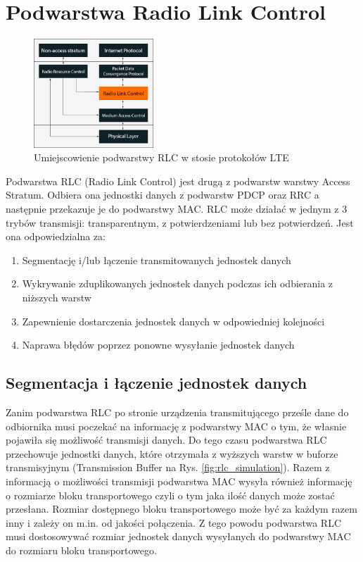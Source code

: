 \chapter{Podwarstwa Radio Link Control}
\label{cha:rlc}

\begin{figure}
	\centerline{\includegraphics[width=0.4\textwidth]{images/rlc_overview.png}}
	\caption{Umiejscowienie podwarstwy RLC w stosie protokołów LTE}
	\label{fig:rlc_overview}
\end{figure}

Podwarstwa RLC (Radio Link Control) jest drugą z podwarstw warstwy Access Stratum. Odbiera ona jednostki danych z podwarstw PDCP oraz RRC a następnie przekazuje je do podwarstwy MAC. RLC może działać w jednym z 3 trybów transmisji: transparentnym, z potwierdzeniami lub bez potwierdzeń. Jest ona odpowiedzialna za:

\begin{enumerate}
	\item Segmentację i/lub łączenie transmitowanych jednostek danych
	\item Wykrywanie zduplikowanych jednostek danych podczas ich odbierania z niższych warstw
	\item Zapewnienie dostarczenia jednostek danych w odpowiedniej kolejności
	\item Naprawa błędów poprzez ponowne wysyłanie jednostek danych
\end{enumerate}

\section{Segmentacja i łączenie jednostek danych}
\label{sec:segmentation}

Zanim podwarstwa RLC po stronie urządzenia transmitującego prześle dane do odbiornika musi poczekać na informację z podwarstwy MAC o tym, że własnie pojawiła się możliwość transmisji danych. Do tego czasu podwarstwa RLC przechowuje jednostki danych, które otrzymała z wyższych warstw w buforze transmisyjnym (Transmission Buffer na Rys. \ref{fig:rlc_simulation}). Razem z informacją o możliwości transmisji podwarstwa MAC wysyła również informację o rozmiarze bloku transportowego czyli o tym jaka ilość danych może zostać przesłana. Rozmiar dostępnego bloku transportowego może być za każdym razem inny i zależy on m.in. od jakości połączenia. Z tego powodu podwarstwa RLC musi dostosowywać rozmiar jednostek danych wysyłanych do podwarstwy MAC do rozmiaru bloku transportowego.


